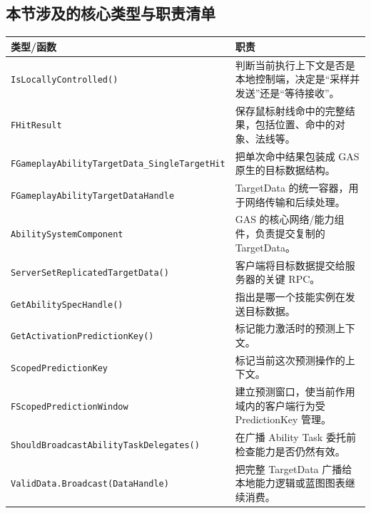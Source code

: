 \documentclass[10pt,CJKmath]{ctexart}
\begin{document}
\subsection{本节涉及的核心类型与职责清单}

\begin{longtable}{>{\raggedright\arraybackslash}p{}
		>{\raggedright\arraybackslash}p{}}
	\toprule
	类型/函数 & 职责 \\
	\midrule
	\endhead
	
	\texttt{IsLocallyControlled()} &
	判断当前执行上下文是否是本地控制端，决定是“采样并发送”还是“等待接收”。 \\
	
	\texttt{FHitResult} &
	保存鼠标射线命中的完整结果，包括位置、命中的对象、法线等。 \\
	
	\texttt{FGameplayAbilityTargetData\_SingleTargetHit} &
	把单次命中结果包装成 GAS 原生的目标数据结构。 \\
	
	\texttt{FGameplayAbilityTargetDataHandle} &
	TargetData 的统一容器，用于网络传输和后续处理。 \\
	
	\texttt{AbilitySystemComponent} &
	GAS 的核心网络/能力组件，负责提交复制的 TargetData。 \\
	
	\texttt{ServerSetReplicatedTargetData()} &
	客户端将目标数据提交给服务器的关键 RPC。 \\
	
	\texttt{GetAbilitySpecHandle()} &
	指出是哪一个技能实例在发送目标数据。 \\
	
	\texttt{GetActivationPredictionKey()} &
	标记能力激活时的预测上下文。 \\
	
	\texttt{ScopedPredictionKey} &
	标记当前这次预测操作的上下文。 \\
	
	\texttt{FScopedPredictionWindow} &
	建立预测窗口，使当前作用域内的客户端行为受 PredictionKey 管理。 \\
	
	\texttt{ShouldBroadcastAbilityTaskDelegates()} &
	在广播 Ability Task 委托前检查能力是否仍然有效。 \\
	
	\texttt{ValidData.Broadcast(DataHandle)} &
	把完整 TargetData 广播给本地能力逻辑或蓝图图表继续消费。 \\
	\bottomrule
\end{longtable}
\end{document}
